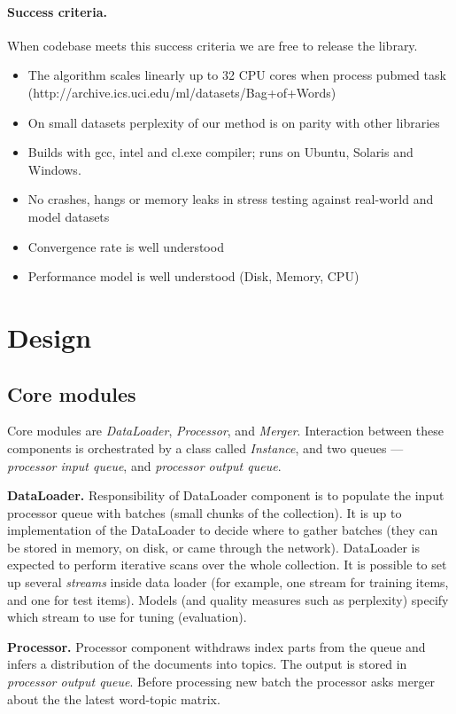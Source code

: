 \documentclass[11pt,a4paper,twoside]{report}
\begin{document}
\paragraph{Success criteria.}
When codebase meets this success criteria we are free to release the library.
\begin{itemize}
    \item The algorithm scales linearly up to 32 CPU cores when process pubmed task (http://archive.ics.uci.edu/ml/datasets/Bag+of+Words)
    \item On small datasets perplexity of our method is on parity with other libraries
    \item Builds with gcc, intel and cl.exe compiler; runs on Ubuntu, Solaris and Windows.
    \item No crashes, hangs or memory leaks in stress testing against real-world and model datasets
    \item Convergence rate is well understood
    \item Performance model is well understood (Disk, Memory, CPU)
\end{itemize}

\section{Design}

\subsection{Core modules}

Core modules are \emph{DataLoader}, \emph{Processor}, and \emph{Merger}.
Interaction between these components is orchestrated by a class called \emph{Instance},
and two queues --- \emph{processor input queue}, and \emph{processor output queue}.

\textbf{DataLoader.} Responsibility of DataLoader component is to populate the input processor queue
with batches (small chunks of the collection).
It is up to implementation of the DataLoader to decide where to gather batches
(they can be stored in memory, on disk, or came through the network).
DataLoader is expected to perform iterative scans over the whole collection.
It is possible to set up several \emph{streams} inside data loader
(for example, one stream for training items, and one for test items).
Models (and quality measures such as perplexity) specify which stream to use for tuning (evaluation).

\textbf{Processor.} Processor component withdraws index parts from the queue
and infers a distribution of the documents into topics.
The output is stored in \emph{processor output queue}.
Before processing new batch the processor asks merger about the the latest word-topic matrix.
\end{document}
